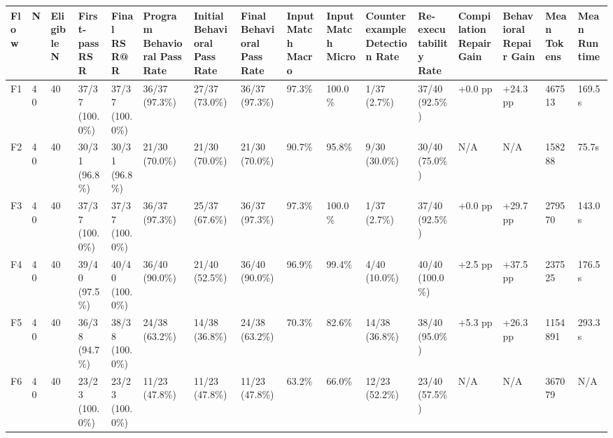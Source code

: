 \begin{longtable}{llllllllllllllll}
Flow & N & Eligible N & First-pass RSR & Final RSR@R & Program Behavioral Pass Rate & Initial Behavioral Pass Rate & Final Behavioral Pass Rate & Input Match Macro & Input Match Micro & Counterexample Detection Rate & Re-executability Rate & Compilation Repair Gain & Behavioral Repair Gain & Mean Tokens & Mean Runtime \\ \hline
F1 & 40 & 40 & 37/37 (100.0\%) & 37/37 (100.0\%) & 36/37 (97.3\%) & 27/37 (73.0\%) & 36/37 (97.3\%) & 97.3\% & 100.0\% & 1/37 (2.7\%) & 37/40 (92.5\%) & +0.0 pp & +24.3 pp & 467513 & 169.5s \\
F2 & 40 & 40 & 30/31 (96.8\%) & 30/31 (96.8\%) & 21/30 (70.0\%) & 21/30 (70.0\%) & 21/30 (70.0\%) & 90.7\% & 95.8\% & 9/30 (30.0\%) & 30/40 (75.0\%) & N/A & N/A & 158288 & 75.7s \\
F3 & 40 & 40 & 37/37 (100.0\%) & 37/37 (100.0\%) & 36/37 (97.3\%) & 25/37 (67.6\%) & 36/37 (97.3\%) & 97.3\% & 100.0\% & 1/37 (2.7\%) & 37/40 (92.5\%) & +0.0 pp & +29.7 pp & 279570 & 143.0s \\
F4 & 40 & 40 & 39/40 (97.5\%) & 40/40 (100.0\%) & 36/40 (90.0\%) & 21/40 (52.5\%) & 36/40 (90.0\%) & 96.9\% & 99.4\% & 4/40 (10.0\%) & 40/40 (100.0\%) & +2.5 pp & +37.5 pp & 237525 & 176.5s \\
F5 & 40 & 40 & 36/38 (94.7\%) & 38/38 (100.0\%) & 24/38 (63.2\%) & 14/38 (36.8\%) & 24/38 (63.2\%) & 70.3\% & 82.6\% & 14/38 (36.8\%) & 38/40 (95.0\%) & +5.3 pp & +26.3 pp & 1154891 & 293.3s \\
F6 & 40 & 40 & 23/23 (100.0\%) & 23/23 (100.0\%) & 11/23 (47.8\%) & 11/23 (47.8\%) & 11/23 (47.8\%) & 63.2\% & 66.0\% & 12/23 (52.2\%) & 23/40 (57.5\%) & N/A & N/A & 367079 & N/A \\
\end{longtable}
